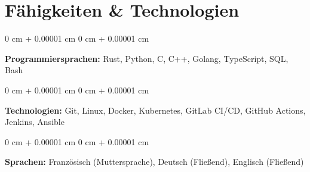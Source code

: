 \documentclass[10pt, letterpaper]{article}
\newenvironment{onecolentry}{
    \begin{adjustwidth}{
        0 cm + 0.00001 cm
    }{
        0 cm + 0.00001 cm
    }
}{
    \end{adjustwidth}
}
\begin{document}
    \section{Fähigkeiten \& Technologien}

    \begin{onecolentry}
        \textbf{Programmiersprachen:} Rust, Python, C, C++, Golang, TypeScript, SQL, Bash
    \end{onecolentry}

    \vspace{0.2 cm}

    \begin{onecolentry}
        \textbf{Technologien:} Git, Linux, Docker, Kubernetes, GitLab CI/CD, GitHub Actions, Jenkins, Ansible
    \end{onecolentry}

    \vspace{0.2 cm}

    \begin{onecolentry}
        \textbf{Sprachen:} Französisch (Muttersprache), Deutsch (Fließend), Englisch (Fließend)
    \end{onecolentry}
\end{document}
